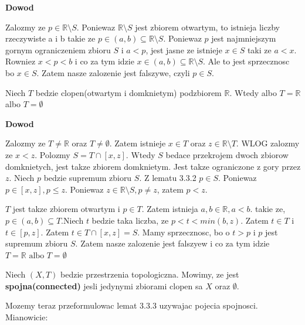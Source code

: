 \documentclass{article}
\begin{document}
\textbf{Dowod}

Zalozmy ze $p\in \mathbb{R} \setminus S$. Poniewaz $\mathbb{R} \setminus S$ jest zbiorem otwartym, to istnieja liczby rzeczywiste a i b takie ze $p\in (a,b) \subseteq \mathbb{R} \setminus S$. Poniewaz $p$ jest najmniejszym gornym ograniczeniem zbioru $S$ i $a<p$, jest jasne ze istnieje $x \in S$ taki ze $a<x$. Rowniez $x<p<b$ i co za tym idzie $x \in (a,b) \subseteq \mathbb{R} \setminus S$. Ale to jest sprzecznosc bo $x\in S$. Zatem nasze zalozenie jest falszywe, czyli $p \in S$.

\begin{tcolorbox}[colback=white!90!green,colframe=black!35!green,title=3.3.3 Lemat: Clopen podzbior $\mathbb{R}$]

    Niech $T$ bedzie clopen(otwartym i domknietym) podzbiorem $\mathbb{R}$. Wtedy albo $T = \mathbb{R}$ albo $T = \emptyset$

\end{tcolorbox}

\textbf{Dowod}

Zalozmy ze $T \neq \mathbb{R}$ oraz $T \neq \emptyset$. Zatem istnieje $x \in T$ oraz $z \in \mathbb{R} \setminus T$. WLOG zalozmy ze $x<z$. Polozmy $S = T \cap [x,z]$. Wtedy $S$ bedace przekrojem dwoch zbiorow domknietych, jest takze zbiorem domknietym. Jest takze ograniczone z gory przez $z$. Niech $p$ bedzie supremum zbioru $S$. Z lematu 3.3.2 $p \in S$. Poniewaz $p \in [x,z], p\leq z$. Poniewaz $z \in \mathbb{R} \setminus S, p \neq z$, zatem $p<z$.

$T$ jest takze zbiorem otwartym i $p \in T$. Zatem istnieja $a,b \in \mathbb{R}, a<b$. takie ze, $p \in (a,b) \subseteq T$.Niech $t$ bedzie taka liczba, ze $p <t <min(b,z)$. Zatem $t \in T$ i $t \in [p,z]$. Zatem $t \in T\cap [x,z] = S$. Mamy sprzecznosc, bo o $t>p$ i $p$ jest supremum zbioru $S$. Zatem nasze zalozenie jest falszyew i co za tym idzie $T = \mathbb{R} \text{ albo } T = \emptyset$

\begin{tcolorbox}[colback=white!90!red,colframe=black!35!red,title=3.3.4 Definicja:Spojnosc(connected)]

    Niech $(X,T)$ bedzie przestrzenia topologiczna. Mowimy, ze jest \textbf{spojna(connected)} jesli jedynymi zbiorami clopen sa $X$ oraz $\emptyset$.

\end{tcolorbox}

Mozemy teraz przeformulowac lemat 3.3.3 uzywajac pojecia spojnosci. Mianowicie:
\end{document}
